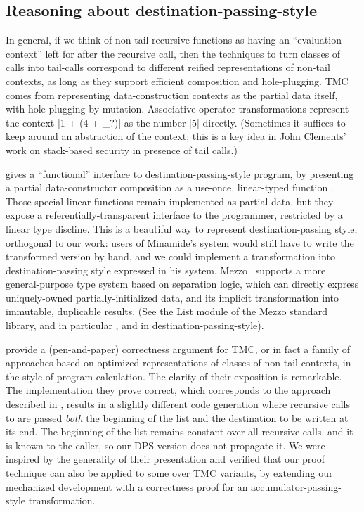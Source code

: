 \subsection{Reasoning about destination-passing-style}

In general, if we think of non-tail recursive functions as having an
``evaluation context'' left for after the recursive call, then the
techniques to turn classes of calls into tail-calls correspond to
different reified representations of non-tail contexts, as long as
they support efficient composition and hole-plugging. TMC comes from
representing data-construction contexts as the partial data itself,
with hole-plugging by mutation. Associative-operator transformations
represent the context \ocaml|1 + (4 + _?)| as the number \ocaml|5|
directly. (Sometimes it suffices to keep around an abstraction of the
context; this is a key idea in John Clements' work on stack-based
security in presence of tail calls.)

\citet*{minamide-98} gives a ``functional'' interface to
destination-passing-style program, by presenting a partial
data-constructor composition  as a use-once,
linear-typed function . Those special
linear functions remain implemented as partial data, but they expose
a referentially-transparent interface to the programmer, restricted by
a linear type discline. This is a beautiful way to represent
destination-passing style, orthogonal to our work: users of Minamide's
system would still have to write the transformed version by hand, and
we could implement a transformation into destination-passing style
expressed in his system. Mezzo~\citep*{mezzo-2016}
supports a more general-purpose type system based on separation logic,
which can directly express uniquely-owned partially-initialized data,
and its implicit transformation into immutable, duplicable
results. (See the
\href{https://protz.github.io/mezzo/code_samples/list.mz.html}{List}
module of the Mezzo standard library, and in particular ,
 and  in destination-passing-style).

\citet*{tmc-koka-2023} provide a (pen-and-paper) correctness argument
for TMC, or in fact a family of approaches based on optimized
representations of classes of non-tail contexts, in the style of
program calculation. The clarity of their exposition is
remarkable. The implementation they prove correct, which corresponds
to the approach described in \citet*{minamide-98}, results in
a slightly different code generation where recursive calls to
 are passed \emph{both} the beginning of the list and
the destination to be written at its end. The beginning of the list
remains constant over all recursive calls, and it is known to the
caller, so our DPS version does not propagate it. We were inspired by
the generality of their presentation and verified that our proof
technique can also be applied to some over TMC variants, by extending
our mechanized development with a correctness proof for an
accumulator-passing-style transformation.

